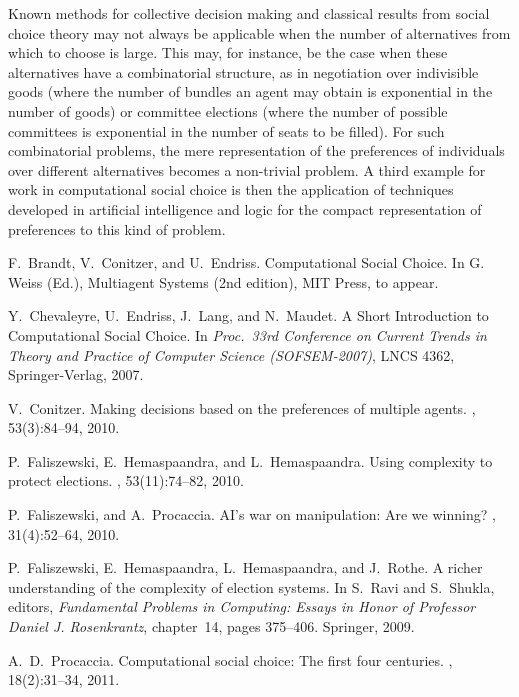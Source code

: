 \documentclass{comsoc2014}
\begin{document}
Known methods for collective decision making and classical results from 
social choice theory may not always be applicable when the number of 
alternatives from which to choose is large. This may, for instance, be 
the case when these alternatives have a combinatorial structure, as in 
negotiation over indivisible goods (where the number of bundles an agent 
may obtain is exponential in the number of goods) or committee elections 
(where the number of possible committees is exponential in the number 
of seats to be filled). For such combinatorial problems, the mere 
representation of the preferences of individuals over different 
alternatives becomes a non-trivial problem. A third example for work 
in computational social choice is then the application of techniques 
developed in artificial intelligence and logic for the compact 
representation of preferences to this kind of problem. 



\begin{thebibliography}{1}

F.~Brandt, V.~Conitzer, and U.~Endriss.
\newblock Computational Social Choice. 
\newblock In G. Weiss (Ed.), Multiagent Systems (2nd edition), MIT Press, to appear.


Y.~Chevaleyre, U.~Endriss, J.~Lang, and N.~Maudet. 
A Short Introduction to Computational Social Choice. 
In \emph{Proc.\ 33rd Conference on Current Trends in 
Theory and Practice of Computer Science (SOFSEM-2007)}, 
LNCS 4362, Springer-Verlag, 2007.


V.~Conitzer.
\newblock Making decisions based on the preferences of multiple agents.
, 53(3):84--94, 2010.


P.~Faliszewski, E.~Hemaspaandra, and L.~Hemaspaandra.
\newblock Using complexity to protect elections.
, 53(11):74--82, 2010.

P.~Faliszewski, and A.~Procaccia.
\newblock AI's war on manipulation: Are we winning?
, 31(4):52--64, 2010.


P.~Faliszewski, E.~Hemaspaandra, L.~Hemaspaandra, and J.~Rothe.
\newblock A richer understanding of the complexity of election systems.
\newblock In S.~Ravi and S.~Shukla, editors, {\em Fundamental Problems in
  Computing: {Essays} in Honor of {Professor} {Daniel} {J.} {Rosenkrantz}},
  chapter~14, pages 375--406. Springer, 2009.

A.~D.~Procaccia.
\newblock Computational social choice: The first four centuries.
, 18(2):31--34, 2011.



\end{thebibliography}
\end{document}
